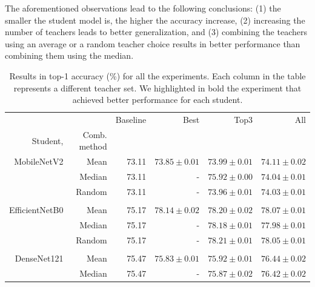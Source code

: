 \documentclass{elsarticle}
\begin{document}
	The aforementioned observations lead to the following conclusions: (1) the smaller the student model is, the higher the accuracy increase, (2) increasing the number of teachers leads to better generalization, and (3) combining the teachers using an average or a random teacher choice results in better performance than combining them using the median.

	\begin{table}[h]
	 \footnotesize
	\centering

	\caption{Results in top-1 accuracy (\%) for all the experiments. Each column in the table represents a different teacher set. We highlighted in bold the experiment that achieved better performance for each student.}
	\begin{tabular}{rrrrrr}
		\toprule
		               &              & Baseline &              Best &              Top3 &               All \\
		      Student, & Comb. method &          &                   &                   &                   \\ \midrule
		   MobileNetV2 &         Mean &    73.11& $ 73.85 \pm 0.01$ &  $73.99 \pm 0.01$ &  $\mathbf{74.11 \pm 0.02}$ \\
		               &       Median &    73.11 &                 - &  $75.92 \pm 0.00$ &  $74.04 \pm 0.01$ \\
		               &       Random &    73.11 &                 - &  $73.96 \pm 0.01$ &  $74.03 \pm 0.01$ \\
		               &              &          &                   &                   &                   \\
		EfficientNetB0 &         Mean &    75.17 & $ 78.14 \pm 0.02$ &  $78.20 \pm 0.02$ &  $78.07 \pm 0.01$ \\
		               &       Median &    75.17 &                 - &  $78.18 \pm 0.01$ &  $77.98 \pm 0.01$ \\
		               &       Random &    75.17 &                 - &  $\mathbf{78.21 \pm 0.01}$ &  $78.05 \pm 0.01$ \\
		               &              &          &                   &                   &                   \\
		   DenseNet121 &         Mean &    75.47 & $ 75.83 \pm 0.01$ &  $75.92 \pm 0.01$ &  $\mathbf{76.44 \pm 0.02}$ \\
		               &       Median &    75.47 &                 - & $ 75.87 \pm 0.02$ & $ 76.42 \pm 0.02$ \\

\end{tabular}
\end{table}
\end{document}
